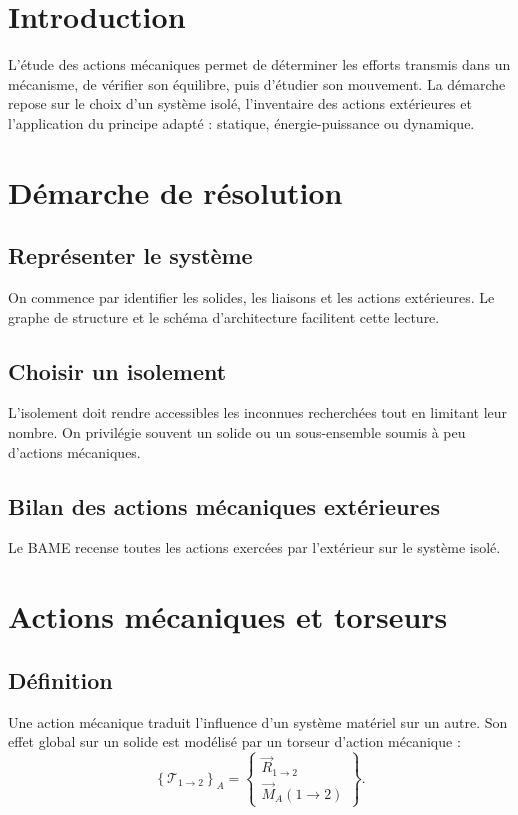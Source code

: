 \section{Introduction}
L'étude des actions mécaniques permet de déterminer les efforts transmis dans un mécanisme, de vérifier son équilibre, puis d'étudier son mouvement. La démarche repose sur le choix d'un système isolé, l'inventaire des actions extérieures et l'application du principe adapté : statique, énergie-puissance ou dynamique.

\section{Démarche de résolution}
\subsection{Représenter le système}
On commence par identifier les solides, les liaisons et les actions extérieures. Le graphe de structure et le schéma d'architecture facilitent cette lecture.
\TLGrapheStructureSimple

\subsection{Choisir un isolement}
L'isolement doit rendre accessibles les inconnues recherchées tout en limitant leur nombre. On privilégie souvent un solide ou un sous-ensemble soumis à peu d'actions mécaniques.

\subsection{Bilan des actions mécaniques extérieures}
Le BAME recense toutes les actions exercées par l'extérieur sur le système isolé.
\TLBAME
\TLChaineResolutionStatique

\section{Actions mécaniques et torseurs}
\subsection{Définition}
Une action mécanique traduit l'influence d'un système matériel sur un autre. Son effet global sur un solide est modélisé par un torseur d'action mécanique :
\[
\left\{\mathcal T_{1\rightarrow2}\right\}_A=
\left\{\begin{array}{c}
\vec R_{1\rightarrow2}\\
\vec M_A(1\rightarrow2)
\end{array}\right\}.
\]

